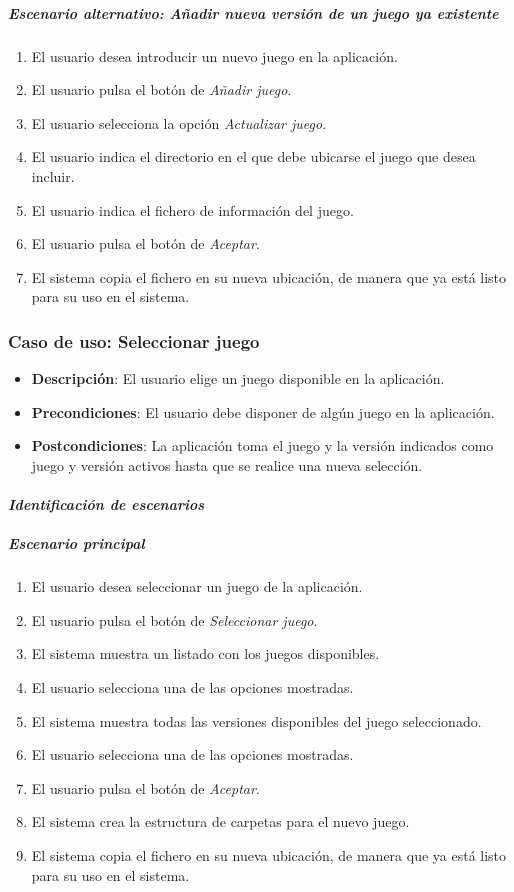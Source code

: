 \subparagraph{Escenario alternativo: Añadir nueva versión de un juego ya existente}
\begin{enumerate}
    \item El usuario desea introducir un nuevo juego en la aplicación.
    \item El usuario pulsa el botón de \textit{Añadir juego}.
    \item El usuario selecciona la opción \textit{Actualizar juego}.
    \item El usuario indica el directorio en el que debe ubicarse el juego que desea incluir.
    \item El usuario indica el fichero de información del juego.
    \item El usuario pulsa el botón de \textit{Aceptar}.
    \item El sistema copia el fichero en su nueva ubicación, de manera que ya está listo 
    para su uso en el sistema.
\end{enumerate}

\subsubsection{Caso de uso: Seleccionar juego}
\begin{itemize}
    \item \textbf{Descripción}: El usuario elige un juego disponible en la aplicación.
    \item \textbf{Precondiciones}: El usuario debe disponer de algún juego en la aplicación.
    \item \textbf{Postcondiciones}: La aplicación toma el juego y la versión indicados
    como juego y versión activos hasta que se realice una nueva selección.
\end{itemize}

\paragraph{\textit{Identificación de escenarios}}
\subparagraph{Escenario principal}
\begin{enumerate}
    \item El usuario desea seleccionar un juego de la aplicación.
    \item El usuario pulsa el botón de \textit{Seleccionar juego}.
    \item El sistema muestra un listado con los juegos disponibles.
    \item El usuario selecciona una de las opciones mostradas.
    \item El sistema muestra todas las versiones disponibles del juego seleccionado.
    \item El usuario selecciona una de las opciones mostradas.
    \item El usuario pulsa el botón de \textit{Aceptar}.
    \item El sistema crea la estructura de carpetas para el nuevo juego.
    \item El sistema copia el fichero en su nueva ubicación, de manera que ya está listo 
    para su uso en el sistema.
\end{enumerate}

